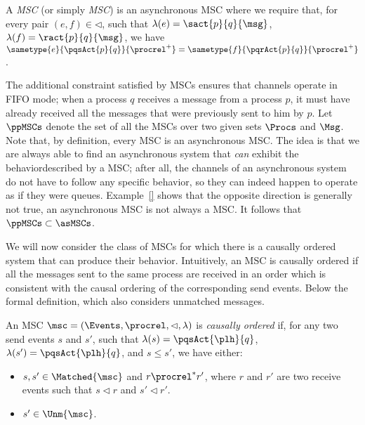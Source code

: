 \begin{definition}
A \emph{\pp MSC} (or simply \emph{MSC}) is an asynchronous MSC where we require that, for every pair $(e,f) \in {\lhd}$, such that $\lambda(e) = \sact{p}{q}{\msg}$, $\lambda(f) = \ract{p}{q}{\msg}$, we have $\sametype{e}{\pqsAct{p}{q}}{\procrel^+} = \sametype{f}{\pqrAct{p}{q}}{\procrel^+}$.
\end{definition}

The additional constraint satisfied by \pp MSCs ensures that channels operate in FIFO mode; when a process $q$ receives a message from a process $p$, it must have already received all the messages that were previously sent to him by $p$. Let $\ppMSCs$ denote the set of all the \pp MSCs over two given sets $\Procs$ and $\Msg$. Note that, by definition, every \pp MSC is an asynchronous MSC. The idea is that we are always able to find an asynchronous system that \emph{can} exhibit the behaviordescribed by a \pp MSC; after all, the channels of an asynchronous system do not have to follow any specific behavior, so they can indeed happen to operate as if they were queues. Example~\ref{} shows that the opposite direction is generally not true, an asynchronous MSC is not always a \pp MSC. It follows that $\ppMSCs \subset \asMSCs$.

\medskip

We will now consider the class of MSCs for which there is a causally ordered system that can produce their behavior. Intuitively, an MSC is causally ordered if all the messages sent to the same process are received in an order which is consistent with the causal ordering of the corresponding send events. Below the formal definition, which also considers unmatched messages.
\begin{definition}
An MSC $\msc = (\Events,\procrel,\lhd,\lambda)$ is \emph{causally ordered} if, for any two send events $s$ and $s'$, such that $\lambda(s)=\pqsAct{\plh}{q}$, $\lambda(s')=\pqsAct{\plh}{q}$, and $s \le s'$, we have either:
\begin{itemize}\itemsep=0.5ex
	\item $s,s' \in \Matched{\msc}$ and $r \procrel^* r'$, where $r$ and $r'$ are two receive events such that $s \lhd r$ and $s' \lhd r'$.
	\item $s' \in \Unm{\msc}$.
\end{itemize}
\end{definition}

